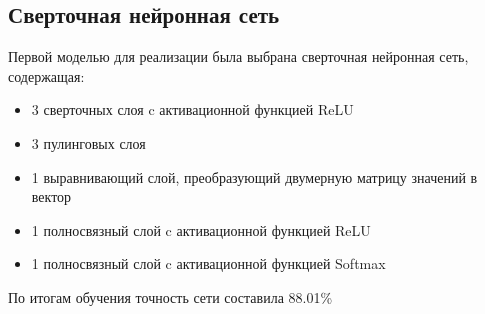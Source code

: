 \subsection{Сверточная нейронная сеть}
Первой моделью для реализации была выбрана сверточная нейронная сеть, содержащая:
\begin{itemize}
  \item 3 сверточных слоя c активационной функцией ReLU
  \item 3 пулинговых слоя
  \item 1 выравнивающий слой, преобразующий двумерную матрицу значений в вектор
  \item 1 полносвязный слой c активационной функцией ReLU
  \item 1 полносвязный слой c активационной функцией Softmax
\end{itemize}

По итогам обучения точность сети составила 88.01\%
\clearpage